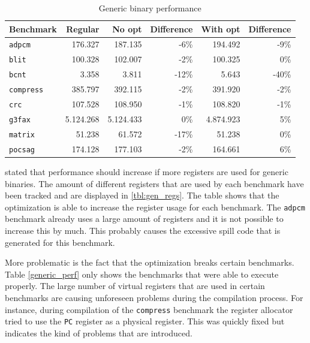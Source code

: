 \begin{table}
  \centering
    \begin{tabular}{|l|r|r|r|r|r|}
    \hline
    \textbf{Benchmark} & \multicolumn{1}{|r|}{\textbf{Regular}} & \multicolumn{1}{|r|}{\textbf{No opt}}  & \multicolumn{1}{|r|}{\textbf{Difference}} & \multicolumn{1}{|r|}{\textbf{With opt}}  & \multicolumn{1}{|r|}{\textbf{Difference}} \\ \hline
	\texttt{adpcm} 		&  176.327 	&	 187.135 	& -6\%	&	 194.492 	& -9\%	\\ \hline
	\texttt{blit} 		&  100.328 	&	 102.007 	& -2\%	&	 100.325 	& 0\%	\\ \hline
	\texttt{bcnt} 		&  3.358  	&	 3.811 		& -12\%	&	 5.643	 	& -40\%	\\ \hline
	\texttt{compress} 	&  385.797 	&	 392.115 	& -2\%	&	 391.920 	& -2\%	\\ \hline
	\texttt{crc} 		&  107.528 	&	 108.950 	& -1\%	&	 108.820 	& -1\%	\\ \hline
	\texttt{g3fax} 		& 5.124.268	& 	 5.124.433	& 0\%	& 	 4.874.923 	& 5\%	\\ \hline
	\texttt{matrix} 	&  51.238 	&	 61.572 	& -17\%	&	 51.238 	& 0\%	\\ \hline
	\texttt{pocsag} 	& 174.128	& 	177.103		& -2\%	& 	 164.661  	& 6\%	\\ \hline
    \end{tabular}
  \caption{Generic binary performance}
  \label{tbl:generic_perf}
\end{table}

\cite{Anthony-Brandon:2013jk} stated that performance should increase if more registers are used for generic binaries. The amount of different registers that are used by each benchmark have been tracked and are displayed in \ref{tbl:gen_regs}. The table shows that the optimization is able to increase the register usage for each benchmark. The \texttt{adpcm} benchmark already uses a large amount of registers and it is not possible to increase this by much. This probably causes the excessive spill code that is generated for this benchmark.

More problematic is the fact that the optimization breaks certain benchmarks. Table \ref{generic_perf} only shows the benchmarks that were able to execute properly. The large number of virtual registers that are used in certain benchmarks are causing unforeseen problems during the compilation process. For instance, during compilation of the \texttt{compress} benchmark the register allocator tried to use the \texttt{PC} register  as a physical register. This was quickly fixed but indicates the kind of problems that are introduced.

